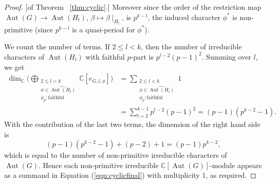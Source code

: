 \documentclass[10pt,a4paper]{amsart}
\newcommand{\Aut}{\operatorname{Aut}}
\begin{document}
\begin{proof}{[of Theorem ~\ref{thm:cyclic}.]}
Moreover since the order of the restriction map $\Aut(G)\to \Aut(H_l)$, $\beta\mapsto \beta\mid_{H_l}$, is $p^{k-l}$, the induced character $\phi^*$ is non-primitive (since $p^{k-l}$ is a quasi-period for $\phi^*$).

We count the number of terms. If $2\le l< k$, then the number of irreducible characters of $\Aut(H_l)$ with faithful $p$-part is $p^{l-2}(p-1)^2$. Summing over $l$, we get
\begin{align*}
\dim_\mathbb C\Big(\bigoplus_{\substack{2\le l< k\\ \phi\in \widehat{\Aut(H_l)}\\ \phi_p:\text{faithful}}}\mathbb C[e_{G, l, \phi}]\Big)&=\sum_{\substack{2\le l< k\\ \phi\in \widehat{\Aut(H_l)}\\ \phi_p:\text{faithful}}}1 \\ &= \sum_{l=2}^{k-1} p^{l-2}(p-1)^2 = (p-1)(p^{k-2}-1).
\end{align*}
With the contribution of the last two terms, the dimension of the right hand side is
\[
(p-1)(p^{k-2}-1) + (p-2) + 1 = (p-1)p^{k-2},
\]
which is equal to the number of non-primitive irreducible characters of $\Aut(G)$. Hence each non-primitive irreducible $\mathbb C[\Aut(G)]$-module appears as a summand in Equation (\ref{eqn:cyclicfinal}) with multiplicity 1, as required.
\end{proof}
\end{document}
